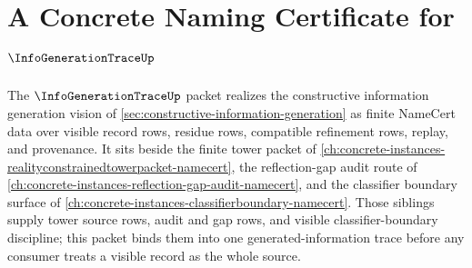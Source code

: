 \chapter{A Concrete Naming Certificate for $\InfoGenerationTraceUp$}
\label{ch:concrete-instances-info-generation-trace-namecert}

The $\InfoGenerationTraceUp$ packet realizes the constructive information generation vision of \autoref{sec:constructive-information-generation} as finite NameCert data over visible record rows, residue rows, compatible refinement rows, replay, and provenance. It sits beside the finite tower packet of \autoref{ch:concrete-instances-realityconstrainedtowerpacket-namecert}, the reflection-gap audit route of \autoref{ch:concrete-instances-reflection-gap-audit-namecert}, and the classifier boundary surface of \autoref{ch:concrete-instances-classifierboundary-namecert}. Those siblings supply tower source rows, audit and gap rows, and visible classifier-boundary discipline; this packet binds them into one generated-information trace before any consumer treats a visible record as the whole source.


